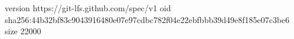 version https://git-lfs.github.com/spec/v1
oid sha256:44b32bf83c9043916480e07e97cdbc782f04e22ebfbbb39d49e8f185e07c3be6
size 22000
